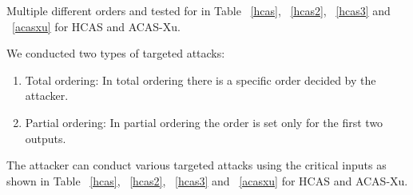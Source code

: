 Multiple different orders and tested for in Table ~\ref{hcas}, ~\ref{hcas2}, ~\ref{hcas3} and ~\ref{acasxu} for \ac{HCAS} and \ac{ACAS-Xu}. 


We conducted two types of targeted attacks:
\begin{enumerate}
\item Total ordering: In total ordering there is a specific order decided by the attacker.
\item Partial ordering: In partial ordering the order is set only for the first two outputs.  
\end{enumerate}

 
The attacker can conduct various targeted attacks using the critical inputs as shown in Table ~\ref{hcas}, ~\ref{hcas2}, ~\ref{hcas3} and ~\ref{acasxu} for \ac{HCAS} and \ac{ACAS-Xu}. 

